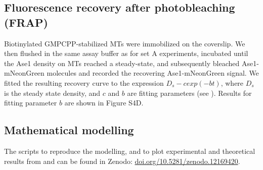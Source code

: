 \subsection{Fluorescence recovery after photobleaching (FRAP)}
Biotinylated GMPCPP-stabilized MTs were immobilized on the coverslip. We then flushed in the same assay buffer as for set A experiments, incubated until the Ase1 density on MTs reached a steady-state, and subsequently bleached Ase1-mNeonGreen molecules and recorded the recovering Ase1-mNeonGreen signal. We fitted the resulting recovery curve to the expression $D_s - c exp(-bt)$, where $D_s$ is the steady state density, and $c$ and $b$ are fitting parameters (see ). Results for fitting parameter $b$ are shown in Figure S4D.

\subsection{Mathematical modelling}
The scripts to reproduce the modelling, and to plot experimental and theoretical results from  and  can be found in Zenodo: \url{doi.org/10.5281/zenodo.12169420}. 

